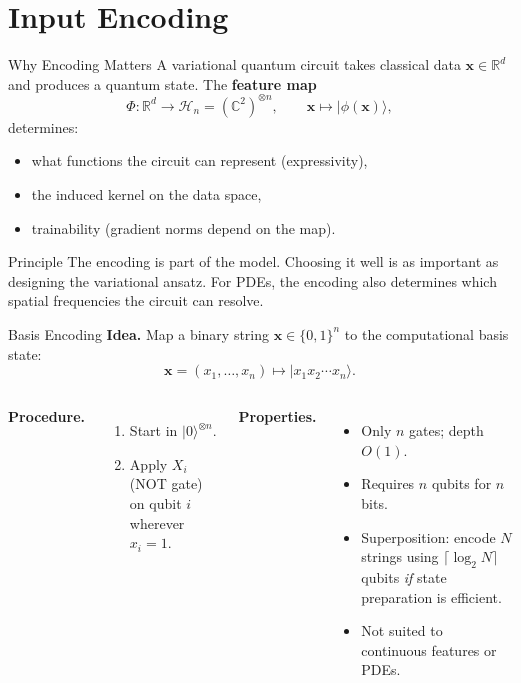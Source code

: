 \documentclass[aspectratio=169,11pt]{beamer}
\newcommand{\R}{\mathbb{R}}
\newcommand{\C}{\mathbb{C}}
\newcommand{\hilb}{\mathcal{H}}
\newcommand{\bx}{\mathbf{x}}
\begin{document}
\section{Input Encoding}

\begin{frame}{Why Encoding Matters}
  A variational quantum circuit takes classical data $\bx\in\R^d$
  and produces a quantum state.  The \textbf{feature map}
  \[
    \Phi:\R^d \longrightarrow \hilb_n = (\C^2)^{\otimes n},
    \qquad \bx \mapsto |\phi(\bx)\rangle,
  \]
  determines:
  \begin{itemize}
    \item what functions the circuit can represent (expressivity),
    \item the induced kernel on the data space,
    \item trainability (gradient norms depend on the map).
  \end{itemize}

  \medskip
  \begin{block}{Principle}
    The encoding is part of the model.  Choosing it well is as
    important as designing the variational ansatz.
    For PDEs, the encoding also determines which spatial frequencies
    the circuit can resolve.
  \end{block}
\end{frame}

\begin{frame}{Basis Encoding}
  \textbf{Idea.} Map a binary string $\bx\in\{0,1\}^n$ to the
  computational basis state:
  \[
    \bx = (x_1,\ldots,x_n)
    \longmapsto |x_1 x_2 \cdots x_n\rangle.
  \]

  \medskip
  \begin{columns}[T]
    \textbf{Procedure.}
    \begin{enumerate}
      \item Start in $|0\rangle^{\otimes n}$.
      \item Apply $X_i$ (NOT gate) on qubit $i$ wherever $x_i=1$.
    \end{enumerate}
    \textbf{Properties.}
    \begin{itemize}
      \item Only $n$ gates; depth $O(1)$.
      \item Requires $n$ qubits for $n$ bits.
      \item Superposition: encode $N$ strings using
            $\lceil\log_2 N\rceil$ qubits \emph{if} state
            preparation is efficient.
      \item Not suited to continuous features or PDEs.
    \end{itemize}
  \end{columns}
\end{frame}
\end{document}
